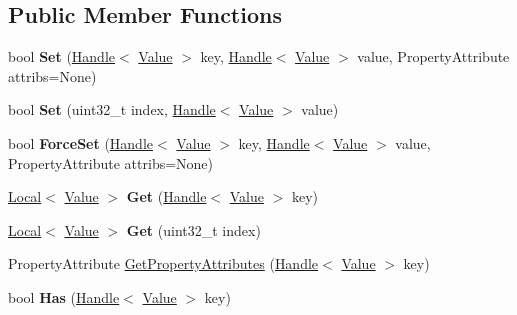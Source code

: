\subsection*{Public Member Functions}
\begin{DoxyCompactItemize}
\item 
\hypertarget{classv8_1_1_object_a208583edae8e8da2c083879429ee3184}{}bool {\bfseries Set} (\hyperlink{classv8_1_1_handle}{Handle}$<$ \hyperlink{classv8_1_1_value}{Value} $>$ key, \hyperlink{classv8_1_1_handle}{Handle}$<$ \hyperlink{classv8_1_1_value}{Value} $>$ value, Property\+Attribute attribs=None)\label{classv8_1_1_object_a208583edae8e8da2c083879429ee3184}

\item 
\hypertarget{classv8_1_1_object_a5779059211f275447f433e7f8a859dd0}{}bool {\bfseries Set} (uint32\+\_\+t index, \hyperlink{classv8_1_1_handle}{Handle}$<$ \hyperlink{classv8_1_1_value}{Value} $>$ value)\label{classv8_1_1_object_a5779059211f275447f433e7f8a859dd0}

\item 
\hypertarget{classv8_1_1_object_aa89f3dce24a3a3431295218d24498c52}{}bool {\bfseries Force\+Set} (\hyperlink{classv8_1_1_handle}{Handle}$<$ \hyperlink{classv8_1_1_value}{Value} $>$ key, \hyperlink{classv8_1_1_handle}{Handle}$<$ \hyperlink{classv8_1_1_value}{Value} $>$ value, Property\+Attribute attribs=None)\label{classv8_1_1_object_aa89f3dce24a3a3431295218d24498c52}

\item 
\hypertarget{classv8_1_1_object_a976f0329ff7465c124652d633d469c06}{}\hyperlink{classv8_1_1_local}{Local}$<$ \hyperlink{classv8_1_1_value}{Value} $>$ {\bfseries Get} (\hyperlink{classv8_1_1_handle}{Handle}$<$ \hyperlink{classv8_1_1_value}{Value} $>$ key)\label{classv8_1_1_object_a976f0329ff7465c124652d633d469c06}

\item 
\hypertarget{classv8_1_1_object_aa494683803b31bcedab121929f4b0b17}{}\hyperlink{classv8_1_1_local}{Local}$<$ \hyperlink{classv8_1_1_value}{Value} $>$ {\bfseries Get} (uint32\+\_\+t index)\label{classv8_1_1_object_aa494683803b31bcedab121929f4b0b17}

\item 
Property\+Attribute \hyperlink{classv8_1_1_object_a45506d0a9192b023284b0211e9bf545b}{Get\+Property\+Attributes} (\hyperlink{classv8_1_1_handle}{Handle}$<$ \hyperlink{classv8_1_1_value}{Value} $>$ key)
\item 
\hypertarget{classv8_1_1_object_a3548568db2a5baa80ffe17c02b3b4880}{}bool {\bfseries Has} (\hyperlink{classv8_1_1_handle}{Handle}$<$ \hyperlink{classv8_1_1_value}{Value} $>$ key)\label{classv8_1_1_object_a3548568db2a5baa80ffe17c02b3b4880}


\end{DoxyCompactItemize}
